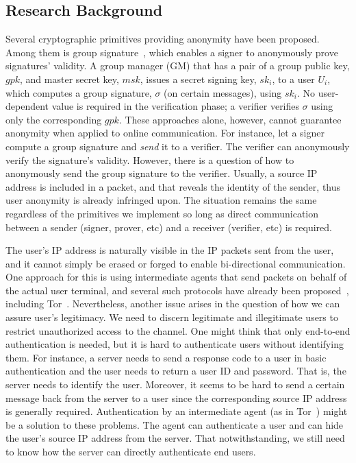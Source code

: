 \documentclass[preprint]{sig-alternate}
\begin{document}
\subsection{Research Background}


Several cryptographic primitives providing anonymity have been proposed. 
Among them is group signature~\cite{[ChaumH91]}, which enables a signer to anonymously prove signatures' validity.
A group manager (GM) that has a pair of a group public key, $gpk$, and master secret key, $msk$, issues a secret signing key, $sk_i$, to a user $U_i$, which computes a group signature, $\sigma$ (on certain messages), using $sk_i$. 
No user-dependent value is required in the verification phase; a verifier verifies $\sigma$ using only the corresponding $gpk$. 
These approaches alone, however, cannot guarantee anonymity when applied to online communication.
For instance, let a signer compute a group signature and \emph{send} it to a verifier. 
The verifier can anonymously verify the signature's validity. 
However, there is a question of how to anonymously send the group signature to the verifier. 
Usually, a source IP address is included in a packet, and that reveals the identity of the sender, thus user anonymity is already infringed upon.
The situation remains the same regardless of the primitives we implement so long as direct communication between a sender (signer, prover, etc) and a receiver (verifier, etc) is required. 


The user's IP address is naturally visible in the IP packets sent from the user, and it cannot simply be erased or forged to enable bi-directional communication. 
One approach for this is using intermediate agents that send packets on behalf of the actual user terminal, and several such protocols have already been proposed~\cite{SPA}, including Tor~\cite{TorProject}. 
Nevertheless, another issue arises in the question of how we can assure user's legitimacy. 
We need to discern legitimate and illegitimate users to restrict unauthorized access to the channel.
One might think that only end-to-end authentication is needed, but it is hard to authenticate users without identifying them.
For instance, a server needs to send a response code to a user in basic authentication and the user needs to return a user ID and password.
That is, the server needs to identify the user.
Moreover, it seems to be hard to send a certain message back from the server to a user since the corresponding source IP address is generally required. 
Authentication by an intermediate agent (as in Tor~\cite{TorProject}) might be a solution to these problems.
The agent can authenticate a user and can hide the user's source IP address from the server. 
That notwithstanding, we still need to know how the server can directly authenticate end users. 
\end{document}
